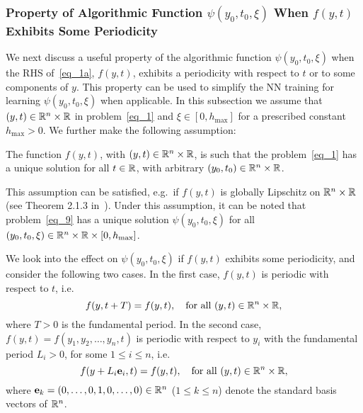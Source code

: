 \subsubsection{Property of Algorithmic Function $\psi(y_0,t_0,\xi)$ When $f(y,t)$
  Exhibits Some Periodicity}
\label{sec_a221}

We next discuss a useful property of the algorithmic
function $\psi(y_0,t_0,\xi)$
when the RHS of~\eqref{eq_1a}, $f(y,t)$,
exhibits a periodicity with respect to $t$ or  to
some components of $y$.
This property can be used to simplify the NN training
for learning  $\psi(y_0,t_0,\xi)$ when applicable.
In this subsection we assume that $(y,t)\in\mathbb{R}^n\times\mathbb{R}$ in
problem~\eqref{eq_1}
and $\xi\in[0,h_{\max}]$ for a prescribed constant $h_{\max}>0$.
We further make the following assumption:
\begin{assumption}\label{ass_1}
  The function $f(y,t)$, with $(y,t)\in\mathbb{R}^n\times\mathbb{R}$,
  is
  such that the problem~\eqref{eq_1}
  has a unique solution for all $t\in\mathbb{R}$, with
  arbitrary $(y_0,t_0)\in\mathbb{R}^n\times\mathbb{R}$.
  
\end{assumption}
\noindent This assumption can be satisfied, e.g.~if $f(y,t)$ is globally
Lipschitz on $\mathbb{R}^n\times\mathbb{R}$ (see Theorem 2.1.3 in~\cite{StuartH1996}).
Under this assumption, it can be noted that problem~\eqref{eq_9} has a unique
solution $\psi(y_0,t_0,\xi)$ for all
$(y_0,t_0,\xi)\in\mathbb{R}^n\times\mathbb{R}\times[0,h_{\max}]$.

We look into the effect on $\psi(y_0,t_0,\xi)$ if $f(y,t)$
exhibits some periodicity, and consider the following two cases.
In the first case, 
$f(y,t)$ is periodic with respect to $t$, i.e.
\begin{equation}\label{eq_a9}
  f(y,t+T) = f(y,t), \quad \text{for all}\ (y,t)\in\mathbb{R}^n\times\mathbb{R},
\end{equation}
where $T>0$ is the fundamental period.
In the second case, $f(y,t)=f(y_1,y_2,\dots,y_n,t)$
is periodic with respect to $y_i$ with the fundamental period $L_i>0$,
for some $1\leqslant i\leqslant n$, i.e.
\begin{equation}\label{eq_a10}
  f(y+L_i\mathbf{e}_i,t) = f(y,t), \quad \text{for all}\ (y,t)\in\mathbb{R}^n\times\mathbb{R},
\end{equation}
where $\mathbf{e}_k=(0,\dots,0,1,0,\dots,0)\in\mathbb{R}^n$ ($1\leqslant k\leqslant n$)
denote the standard basis vectors of $\mathbb{R}^n$.


